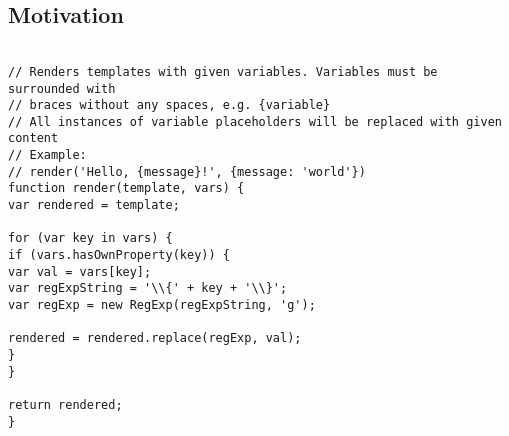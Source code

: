 \subsection{Motivation}


\begin{verbatim}

// Renders templates with given variables. Variables must be surrounded with
// braces without any spaces, e.g. {variable}
// All instances of variable placeholders will be replaced with given content
// Example:
// render('Hello, {message}!', {message: 'world'})
function render(template, vars) {
var rendered = template;

for (var key in vars) {
if (vars.hasOwnProperty(key)) {
var val = vars[key];
var regExpString = '\\{' + key + '\\}';
var regExp = new RegExp(regExpString, 'g');

rendered = rendered.replace(regExp, val);
}
}

return rendered;
}
\end{verbatim}
